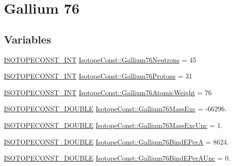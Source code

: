 \hypertarget{group___isotope_const-_gallium-_ga76}{}\section{Gallium 76}
\label{group___isotope_const-_gallium-_ga76}
\subsection*{Variables}
\begin{DoxyCompactItemize}
\item 
\mbox{\hyperlink{group___isotope_const-_macros_ga5f18360b3e99483a35c32d789e62621c}{I\+S\+O\+T\+O\+P\+E\+C\+O\+N\+S\+T\+\_\+\+I\+NT}} \mbox{\hyperlink{group___isotope_const-_gallium-_ga76_gac4bc6029ea77c8bc19d7c8a6910f4c38}{Isotope\+Const\+::\+Gallium76\+Neutrons}} = 45
\item 
\mbox{\hyperlink{group___isotope_const-_macros_ga5f18360b3e99483a35c32d789e62621c}{I\+S\+O\+T\+O\+P\+E\+C\+O\+N\+S\+T\+\_\+\+I\+NT}} \mbox{\hyperlink{group___isotope_const-_gallium-_ga76_gac8b89fdc0e5fcb79b0c1fc4dd824f8c0}{Isotope\+Const\+::\+Gallium76\+Protons}} = 31
\item 
\mbox{\hyperlink{group___isotope_const-_macros_ga5f18360b3e99483a35c32d789e62621c}{I\+S\+O\+T\+O\+P\+E\+C\+O\+N\+S\+T\+\_\+\+I\+NT}} \mbox{\hyperlink{group___isotope_const-_gallium-_ga76_ga386274b4901fea76d9e98e924ad3f6b3}{Isotope\+Const\+::\+Gallium76\+Atomic\+Weight}} = 76
\item 
\mbox{\hyperlink{group___isotope_const-_macros_ga8f45a7272ce02c0b4c65c44636ed719a}{I\+S\+O\+T\+O\+P\+E\+C\+O\+N\+S\+T\+\_\+\+D\+O\+U\+B\+LE}} \mbox{\hyperlink{group___isotope_const-_gallium-_ga76_ga8a4313f2e8303aafc883c328ec62bdcd}{Isotope\+Const\+::\+Gallium76\+Mass\+Exc}} = -\/66296.
\item 
\mbox{\hyperlink{group___isotope_const-_macros_ga8f45a7272ce02c0b4c65c44636ed719a}{I\+S\+O\+T\+O\+P\+E\+C\+O\+N\+S\+T\+\_\+\+D\+O\+U\+B\+LE}} \mbox{\hyperlink{group___isotope_const-_gallium-_ga76_ga1da4fd3474538ab339837c398d5eecf0}{Isotope\+Const\+::\+Gallium76\+Mass\+Exc\+Unc}} = 1.
\item 
\mbox{\hyperlink{group___isotope_const-_macros_ga8f45a7272ce02c0b4c65c44636ed719a}{I\+S\+O\+T\+O\+P\+E\+C\+O\+N\+S\+T\+\_\+\+D\+O\+U\+B\+LE}} \mbox{\hyperlink{group___isotope_const-_gallium-_ga76_gacf2561c03dd1b9288c4bc4fbfd8f156b}{Isotope\+Const\+::\+Gallium76\+Bind\+E\+PerA}} = 8624.
\item 
\mbox{\hyperlink{group___isotope_const-_macros_ga8f45a7272ce02c0b4c65c44636ed719a}{I\+S\+O\+T\+O\+P\+E\+C\+O\+N\+S\+T\+\_\+\+D\+O\+U\+B\+LE}} \mbox{\hyperlink{group___isotope_const-_gallium-_ga76_ga78cd3e3f2139cf31c55a8eccdab4e34b}{Isotope\+Const\+::\+Gallium76\+Bind\+E\+Per\+A\+Unc}} = 0.

\end{DoxyCompactItemize}
